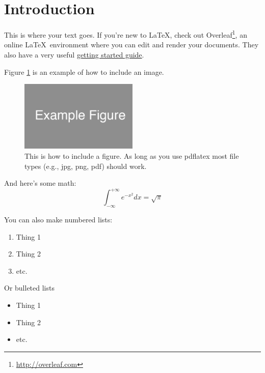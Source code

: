 
\section{Introduction}
This is where your text goes.
If you're new to \LaTeX, check out Overleaf\footnote{\url{http://overleaf.com}}, an online \LaTeX~environment where you can edit and render your documents.
They also have a very useful \href{http://www.overleaf.com/help/18-how-do-i-use-overleaf}{getting started guide}.

Figure \ref{fig:example_figure} is an example of how to include an image.

\begin{figure}[ht]
  \begin{center}
    \includegraphics[width=0.5\textwidth]{figures/example_figure.png}
    \caption{
      This is how to include a figure.
      As long as you use pdflatex most file types (e.g., jpg, png, pdf) should work.}
    \label{fig:example_figure}
  \end{center}
\end{figure}

And here's some math:
\begin{equation}
  \int_{-\infty}^{+\infty} e^{-x^2} dx = \sqrt{\pi}
\end{equation}

You can also make numbered lists:
\begin{enumerate}
  \item Thing 1
  \item Thing 2
  \item etc.
\end{enumerate}

Or bulleted lists
\begin{itemize}
  \item Thing 1
  \item Thing 2
  \item etc.
\end{itemize}

